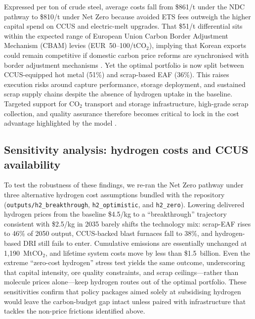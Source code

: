 \documentclass[preprint,1p,authoryear]{elsarticle}
\begin{document}
Expressed per ton of crude steel, average costs fall from \$861/t under the NDC pathway to \$810/t under Net Zero because avoided ETS fees outweigh the higher capital spend on CCUS and electric-melt upgrades. That \$51/t differential sits within the expected range of European Union Carbon Border Adjustment Mechanism (CBAM) levies (EUR~50--100/tCO$_2$), implying that Korean exports could remain competitive if domestic carbon price reforms are synchronised with border adjustment mechanisms \citep{Vogl2018}. Yet the optimal portfolio is now split between CCUS-equipped hot metal (51\%) and scrap-based EAF (36\%). This raises execution risks around capture performance, storage deployment, and sustained scrap supply chains despite the absence of hydrogen uptake in the baseline. Targeted support for CO$_2$ transport and storage infrastructure, high-grade scrap collection, and quality assurance therefore becomes critical to lock in the cost advantage highlighted by the model \citep{Griffin2020}.

\subsection{Sensitivity analysis: hydrogen costs and CCUS availability}

To test the robustness of these findings, we re-ran the Net Zero pathway under three alternative hydrogen cost assumptions bundled with the repository (\texttt{outputs/h2\_breakthrough}, \texttt{h2\_optimistic}, and \texttt{h2\_zero}). Lowering delivered hydrogen prices from the baseline \$4.5/kg to a ``breakthrough'' trajectory consistent with \$2.5/kg in 2035 barely shifts the technology mix: scrap-EAF rises to 46\% of 2050 output, CCUS-backed blast furnaces fall to 38\%, and hydrogen-based DRI still fails to enter. Cumulative emissions are essentially unchanged at 1{,}190~MtCO$_2$, and lifetime system costs move by less than \$1.5~billion. Even the extreme ``zero-cost hydrogen'' stress test yields the same outcome, underscoring that capital intensity, ore quality constraints, and scrap ceilings---rather than molecule prices alone---keep hydrogen routes out of the optimal portfolio. These sensitivities confirm that policy packages aimed solely at subsidising hydrogen would leave the carbon-budget gap intact unless paired with infrastructure that tackles the non-price frictions identified above.
\end{document}
